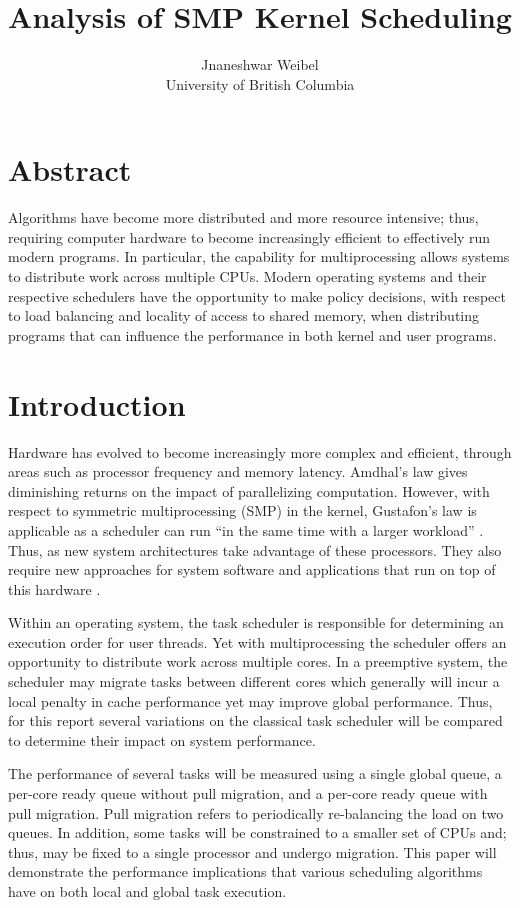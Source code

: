 \documentclass[11pt]{article}
\title{Analysis of SMP Kernel Scheduling}
\author{Jnaneshwar Weibel\\University of British Columbia}
\begin{document}
\maketitle

\section*{Abstract}
\label{sec:abstract}
Algorithms have become more distributed and more resource intensive; thus, requiring computer hardware to become increasingly efficient to effectively run modern programs.  In particular, the capability for multiprocessing allows systems to distribute work across multiple CPUs.  Modern operating systems and their respective schedulers have the opportunity to make policy decisions, with respect to load balancing and locality of access to shared memory, when distributing programs that can influence the performance in both kernel and user programs.


\section{Introduction}
\label{sec:introduction}
Hardware has evolved to become increasingly more complex and efficient, through areas such as processor frequency and memory latency.  Amdhal's law gives diminishing returns on the impact of parallelizing computation.  However, with respect to symmetric multiprocessing (SMP) in the kernel, Gustafon's law is applicable as a scheduler can run ``in the same time with a larger workload'' \cite{gustafon}.  Thus, as new system architectures take advantage of these processors.  They also require new approaches for system software and applications that run on top of this hardware \cite{nitrd}.

Within an operating system, the task scheduler is responsible for determining an execution order for user threads.  Yet with multiprocessing the scheduler offers an opportunity to distribute work across multiple cores.  In a preemptive system, the scheduler may migrate tasks between different cores which generally will incur a local penalty in cache performance yet may improve global performance.  Thus, for this report several variations on the classical task scheduler will be compared to determine their impact on system performance.

The performance of several tasks will be measured using a single global queue, a per-core ready queue without pull migration, and a per-core ready queue with pull migration.  Pull migration refers to periodically re-balancing the load on two queues.  In addition, some tasks will be constrained to a smaller set of CPUs and; thus, may be fixed to a single processor and undergo migration.  This paper will demonstrate the performance implications that various scheduling algorithms have on both local and global task execution.
\end{document}

